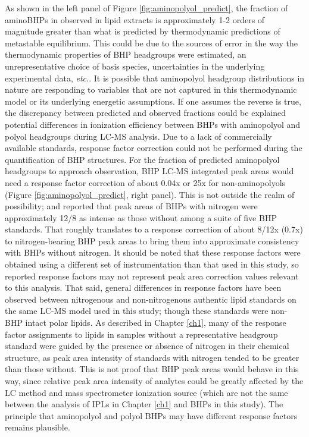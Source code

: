 As shown in the left panel of Figure \ref{fig:aminopolyol_predict}, the fraction of aminoBHPs in observed in lipid extracts is approximately 1-2 orders of magnitude greater than what is predicted by thermodynamic predictions of metastable equilibrium. This could be due to the sources of error in the way the thermodynamic properties of BHP headgroups were estimated, an unrepresentative choice of basis species, uncertainties in the underlying experimental data, \textit{etc.}. It is possible that aminopolyol headgroup distributions in nature are responding to variables that are not captured in this thermodynamic model or its underlying energetic assumptions. If one assumes the reverse is true, the discrepancy between predicted and observed fractions could be explained potential differences in ionization efficiency between BHPs with aminopolyol and polyol headgroups during LC-MS analysis. Due to a lack of commercially available standards, response factor correction could not be performed during the quantification of BHP structures. For the fraction of predicted aminopolyol headgroups to approach observation, BHP LC-MS integrated peak areas would need a response factor correction of about 0.04x or 25x for non-aminopolyols (Figure \ref{fig:aminopolyol_predict}, right panel). This is not outside the realm of possibility; \cite{cooke2008bacterial} and \cite{van2012bacteriohopanepolyol} reported that peak areas of BHPs with nitrogen were approximately 12/8 as intense as those without among a suite of five BHP standards. That roughly translates to a response correction of about 8/12x (0.7x) to nitrogen-bearing BHP peak areas to bring them into approximate consistency with BHPs without nitrogen. It should be noted that these response factors were obtained using a different set of instrumentation than that used in this study, so reported response factors may not represent peak area correction values relevant to this analysis. That said, general differences in response factors have been observed between nitrogenous and non-nitrogenous authentic lipid standards on the same LC-MS model used in this study; though these standards were non-BHP intact polar lipids. As described in Chapter \ref{ch1}, many of the response factor assignments to lipids in samples without a representative headgroup standard were guided by the presence or absence of nitrogen in their chemical structure, as peak area intensity of standards with nitrogen tended to be greater than those without. This is not proof that BHP peak areas would behave in this way, since relative peak area intensity of analytes could be greatly affected by the LC method and mass spectrometer ionization source (which are not the same between the analysis of IPLs in Chapter \ref{ch1} and BHPs in this study). The principle that aminopolyol and polyol BHPs may have different response factors remains plausible.

